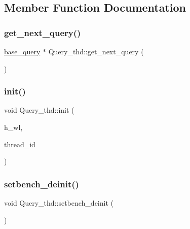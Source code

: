 \subsection{Member Function Documentation}
\mbox{\label{classQuery__thd_a11c17eecb3ed06f31382ee86deebb258}} 
\subsubsection{\texorpdfstring{get\+\_\+next\+\_\+query()}{get\_next\_query()}}
{\footnotesize\ttfamily \hyperlink{classbase__query}{base\+\_\+query} $\ast$ Query\+\_\+thd\+::get\+\_\+next\+\_\+query (\begin{DoxyParamCaption}{ }\end{DoxyParamCaption})}

\mbox{\label{classQuery__thd_a8a6ee7d0d441e0000d7fc1ad40e87659}} 
\subsubsection{\texorpdfstring{init()}{init()}}
{\footnotesize\ttfamily void Query\+\_\+thd\+::init (\begin{DoxyParamCaption}\item[{\hyperlink{classworkload}{workload} $\ast$}]{h\+\_\+wl,  }\item[{int}]{thread\+\_\+id }\end{DoxyParamCaption})}

\mbox{\label{classQuery__thd_acb9b3b81969cdd8f1a4c9800e5416a07}} 
\subsubsection{\texorpdfstring{setbench\+\_\+deinit()}{setbench\_deinit()}}
{\footnotesize\ttfamily void Query\+\_\+thd\+::setbench\+\_\+deinit (\begin{DoxyParamCaption}{ }\end{DoxyParamCaption})}



